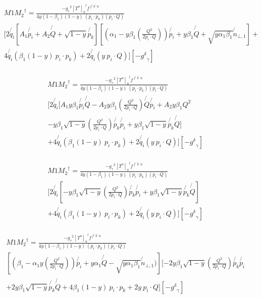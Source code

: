\begin{equation}
\begin{split}
&M1{M_2}^{\dagger}=\frac{-{g_s}^2 {[T^{o}]_a}^{l} f^{\:f^{\prime}\: b^{\prime}\:n}}{4y(1-\beta_1) (1-y)\:(p_i \cdot p_k)(p_i \cdot Q)}\\
&[2\not{q_i}[A_1\not{p_i} + A_2\not{Q} + \sqrt{1-y}\not{p_k}][(\alpha_1 -y\beta_1(\frac{Q^2}{2p_i \cdot Q})) \not{p_i} + y\beta_1\not{Q} + \sqrt{y\alpha_1\beta_1}\not{n}_{\bot,1}]+\\
&4\not{q_i}(\beta_1 (1-y)\:p_i \cdot p_k)+2\not{q_i}( y\:p_i\cdot Q)][-{g^{\delta}}_{\gamma}]\\
\end{split}
\end{equation}

\begin{equation}
\begin{split}
&M1{M_2}^{\dagger}=\frac{-{g_s}^2 {[T^{o}]_a}^{l} f^{\:f^{\prime}\: b^{\prime}\:n}}{4y(1-\beta_1) (1-y)\:(p_i \cdot p_k)(p_i \cdot Q)}\\
&[2\not{q_i}[A_1y\beta_1\not{p_i}\not{Q} - A_2y\beta_1(\frac{Q^2}{2p_i \cdot Q})\not{Q}\not{p_i} +A_2y\beta_1Q^2\\
&- y\beta_1\sqrt{1-y}(\frac{Q^2}{2p_i \cdot Q})\not{p_k}\not{p_i}+y\beta_1\sqrt{1-y}\not{p_k}\not{Q}]\\
&+4\not{q_i}(\beta_1 (1-y)\:p_i \cdot p_k)+2\not{q_i}( y\:p_i\cdot Q)][-{g^{\delta}}_{\gamma}]\\
\end{split}
\end{equation}

\begin{equation}
\begin{split}
&M1{M_2}^{\dagger}=\frac{-{g_s}^2 {[T^{o}]_a}^{l} f^{\:f^{\prime}\: b^{\prime}\:n}}{4y(1-\beta_1) (1-y)\:(p_i \cdot p_k)(p_i \cdot Q)}\\
&[2\not{q_i}[- y\beta_1\sqrt{1-y}(\frac{Q^2}{2p_i \cdot Q})\not{p_k}\not{p_i}+y\beta_1\sqrt{1-y}\not{p_k}\not{Q}]\\
&+4\not{q_i}(\beta_1 (1-y)\:p_i \cdot p_k)+2\not{q_i}( y\:p_i\cdot Q)][-{g^{\delta}}_{\gamma}]\\
\end{split}
\end{equation}

\begin{equation}
\begin{split}
&M1{M_2}^{\dagger}=\frac{-{g_s}^2 {[T^{o}]_a}^{l} f^{\:f^{\prime}\: b^{\prime}\:n}}{4y(1-\beta_1) (1-y)\:(p_i \cdot p_k)(p_i \cdot Q)}\\
&[(\beta_1 -\alpha_1 y(\frac{Q^2}{2p_i \cdot Q}))\not{p_i} + y\alpha_1\not{Q}- \sqrt{y\alpha_1\beta_1}\not{n}_{\bot,1})][-2 y\beta_1\sqrt{1-y}(\frac{Q^2}{2p_i \cdot Q})\not{p_k}\not{p_i}\\
&+2y\beta_1\sqrt{1-y}\not{p_k}\not{Q}+4\beta_1 (1-y)\:p_i \cdot p_k+2 y\:p_i\cdot Q][-{g^{\delta}}_{\gamma}]\\
\end{split}
\end{equation}

